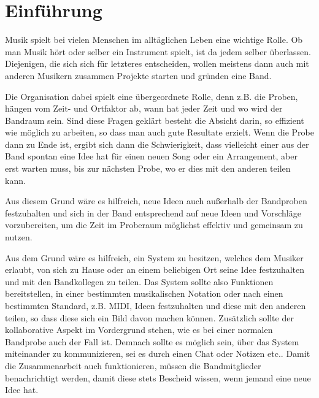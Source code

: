 \documentclass[12pt]{scrartcl}
\begin{document}



\tableofcontents

\newpage


\section{Einführung}


Musik spielt bei vielen Menschen im alltäglichen Leben eine wichtige Rolle. Ob man Musik hört oder selber ein Instrument spielt, ist da jedem selber überlassen. Diejenigen, die sich sich für letzteres entscheiden, wollen meistens dann auch mit anderen Musikern zusammen Projekte starten und gründen eine Band.

Die Organisation dabei spielt eine übergeordnete Rolle, denn z.B. die Proben, hängen vom Zeit- und Ortfaktor ab, wann hat jeder Zeit und wo wird der Bandraum sein. Sind diese Fragen geklärt besteht die Absicht darin, so effizient wie möglich zu arbeiten, so dass man auch gute Resultate erzielt. 
Wenn die Probe dann zu Ende ist, ergibt sich dann die Schwierigkeit, dass vielleicht einer aus der Band spontan eine Idee hat für einen neuen Song oder ein Arrangement, aber erst warten muss, bis zur nächsten Probe, wo er dies mit den anderen teilen kann.

Aus diesem Grund wäre es hilfreich, neue Ideen auch außerhalb der Bandproben festzuhalten und sich in der Band entsprechend auf neue Ideen und Vorschläge vorzubereiten, um die Zeit im Proberaum möglichst effektiv und gemeinsam zu nutzen. 

Aus dem Grund wäre es hilfreich, ein System zu besitzen, welches dem Musiker erlaubt, von sich zu Hause oder an einem beliebigen Ort seine Idee festzuhalten und mit den Bandkollegen zu teilen. Das System sollte also Funktionen bereitstellen, in einer bestimmten musikalischen Notation oder nach einen bestimmten Standard, z.B. MIDI, Ideen festzuhalten und diese mit den anderen teilen, so dass diese sich ein Bild davon machen können. Zusätzlich sollte der kollaborative Aspekt im Vordergrund stehen, wie es bei einer normalen Bandprobe auch der Fall ist. Demnach sollte es möglich sein, über das System miteinander zu kommunizieren, sei es durch einen Chat oder Notizen etc.. Damit die Zusammenarbeit auch funktionieren, müssen die Bandmitglieder benachrichtigt werden, damit diese stets Bescheid wissen, wenn jemand eine neue Idee hat.
\end{document}
